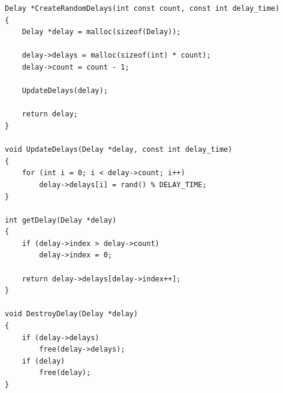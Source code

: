 \begin{lstlisting}[label=some-code,caption=Файл\, для работы с задержками]
Delay *CreateRandomDelays(int const count, const int delay_time)
{
	Delay *delay = malloc(sizeof(Delay));

	delay->delays = malloc(sizeof(int) * count);
	delay->count = count - 1;

	UpdateDelays(delay);

	return delay;
}

void UpdateDelays(Delay *delay, const int delay_time)
{
	for (int i = 0; i < delay->count; i++)
		delay->delays[i] = rand() % DELAY_TIME;
}

int getDelay(Delay *delay)
{
	if (delay->index > delay->count)
		delay->index = 0;

	return delay->delays[delay->index++];
}

void DestroyDelay(Delay *delay)
{
	if (delay->delays)
		free(delay->delays);
	if (delay)
		free(delay);
}
\end{lstlisting}

